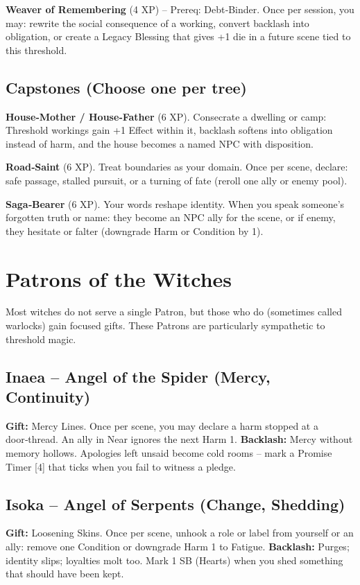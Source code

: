 \documentclass[10pt,a5paper]{book}
\begin{document}
\textbf{Weaver of Remembering} (4 XP) -- Prereq: Debt‑Binder. Once per session, you may: rewrite the social consequence of a working, convert backlash into obligation, or create a Legacy Blessing that gives +1 die in a future scene tied to this threshold.

\subsection{Capstones (Choose one per tree)}

\textbf{House‑Mother / House‑Father} (6 XP). Consecrate a dwelling or camp: Threshold workings gain +1 Effect within it, backlash softens into obligation instead of harm, and the house becomes a named NPC with disposition.

\textbf{Road‑Saint} (6 XP). Treat boundaries as your domain. Once per scene, declare: safe passage, stalled pursuit, or a turning of fate (reroll one ally or enemy pool).

\textbf{Saga‑Bearer} (6 XP). Your words reshape identity. When you speak someone's forgotten truth or name: they become an NPC ally for the scene, or if enemy, they hesitate or falter (downgrade Harm or Condition by 1).

\section{Patrons of the Witches}

Most witches do not serve a single Patron, but those who do (sometimes called warlocks) gain focused gifts. These Patrons are particularly sympathetic to threshold magic.

\subsection{Inaea -- Angel of the Spider (Mercy, Continuity)}
\textbf{Gift:} Mercy Lines. Once per scene, you may declare a harm stopped at a door‑thread. An ally in Near ignores the next Harm 1.
\textbf{Backlash:} Mercy without memory hollows. Apologies left unsaid become cold rooms -- mark a Promise Timer [4] that ticks when you fail to witness a pledge.

\subsection{Isoka -- Angel of Serpents (Change, Shedding)}
\textbf{Gift:} Loosening Skins. Once per scene, unhook a role or label from yourself or an ally: remove one Condition or downgrade Harm 1 to Fatigue.
\textbf{Backlash:} Purges; identity slips; loyalties molt too. Mark 1 SB (Hearts) when you shed something that should have been kept.
\end{document}
